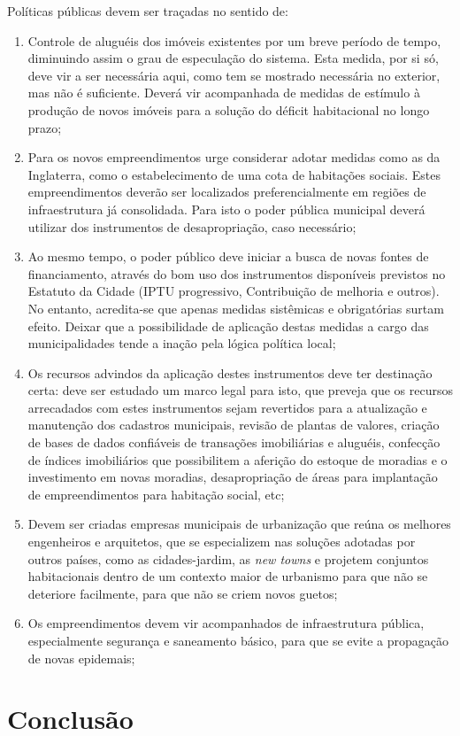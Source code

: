 \documentclass[
	12pt,				%
	oneside,			%
	a4paper,			%
	chapter=TITLE,		%
	section=TITLE,		%
	english,			%
	brazil				%
	]{abntex2}
\begin{document}
Políticas públicas devem ser traçadas no sentido de:
\begin{enumerate}
\def\labelenumi{\arabic{enumi}.}
\item
  Controle de aluguéis dos imóveis existentes por um breve período de tempo,
  diminuindo assim o grau de especulação do sistema. Esta medida, por si só, deve
  vir a ser necessária aqui, como tem se mostrado necessária no exterior, mas não
  é suficiente. Deverá vir acompanhada de medidas de estímulo à produção de novos
  imóveis para a solução do déficit habitacional no longo prazo;
\item
  Para os novos empreendimentos urge considerar adotar medidas como as da
  Inglaterra, como o estabelecimento de uma cota de habitações sociais. Estes
  empreendimentos deverão ser localizados preferencialmente em regiões de
  infraestrutura já consolidada. Para isto o poder pública municipal deverá
  utilizar dos instrumentos de desapropriação, caso necessário;
\item
  Ao mesmo tempo, o poder público deve iniciar a busca de novas fontes de
  financiamento, através do bom uso dos instrumentos disponíveis previstos no
  Estatuto da Cidade (IPTU progressivo, Contribuição de melhoria e outros). No
  entanto, acredita-se que apenas medidas sistêmicas e obrigatórias surtam
  efeito. Deixar que a possibilidade de aplicação destas medidas a cargo das
  municipalidades tende a inação pela lógica política local;
\item
  Os recursos advindos da aplicação destes instrumentos deve ter destinação
  certa: deve ser estudado um marco legal para isto, que preveja que os recursos
  arrecadados com estes instrumentos sejam revertidos para a atualização e
  manutenção dos cadastros municipais, revisão de plantas de valores, criação de
  bases de dados confiáveis de transações imobiliárias e aluguéis, confecção de
  índices imobiliários que possibilitem a aferição do estoque de moradias e o
  investimento em novas moradias, desapropriação de áreas para implantação de
  empreendimentos para habitação social, etc;
\item
  Devem ser criadas empresas municipais de urbanização que reúna os melhores
  engenheiros e arquitetos, que se especializem nas soluções adotadas por outros
  países, como as cidades-jardim, as \emph{new towns} e projetem conjuntos
  habitacionais dentro de um contexto maior de urbanismo para que não se deteriore
  facilmente, para que não se criem novos guetos;
\item
  Os empreendimentos devem vir acompanhados de infraestrutura pública,
  especialmente segurança e saneamento básico, para que se evite a propagação de
  novas epidemais;
\end{enumerate}
\hypertarget{conclusao}{%
\chapter{Conclusão}\label{conclusao}}
\end{document}
